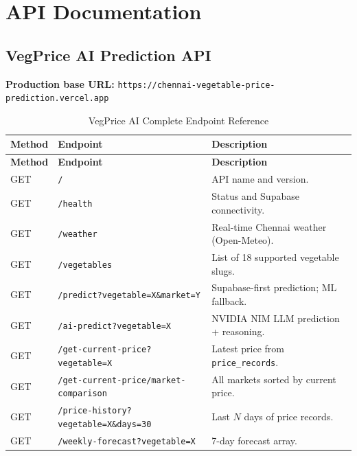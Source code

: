 \documentclass[12pt, a4paper, oneside]{report}
\begin{document}
\chapter{API Documentation}

\section{VegPrice AI Prediction API}

\textbf{Production base URL:}
\texttt{https://chennai-vegetable-price-prediction.vercel.app}

\begin{longtable}{@{} C{1.4cm} L{6.0cm} L{6.8cm} @{}}
\caption{VegPrice AI Complete Endpoint Reference}
\label{tab:pred-endpoints-full} \\
\toprule
\textbf{Method} & \textbf{Endpoint} & \textbf{Description} \\
\midrule
\endfirsthead
\toprule
\textbf{Method} & \textbf{Endpoint} & \textbf{Description} \\
\midrule
\endhead
\bottomrule
\endlastfoot
GET    & \texttt{/}                                   & API name and version. \\[3pt]
GET    & \texttt{/health}                             & Status and Supabase connectivity. \\[3pt]
GET    & \texttt{/weather}                            & Real-time Chennai weather (Open-Meteo). \\[3pt]
GET    & \texttt{/vegetables}                         & List of 18 supported vegetable slugs. \\[3pt]
GET    & \texttt{/predict?vegetable=X\&market=Y}      & Supabase-first prediction; ML fallback. \\[3pt]
GET    & \texttt{/ai-predict?vegetable=X}             & NVIDIA NIM LLM prediction + reasoning. \\[3pt]
GET    & \texttt{/get-current-price?vegetable=X}      & Latest price from \texttt{price\_records}. \\[3pt]
GET    & \texttt{/get-current-price/market-comparison}& All markets sorted by current price. \\[3pt]
GET    & \texttt{/price-history?vegetable=X\&days=30} & Last $N$ days of price records. \\[3pt]
GET    & \texttt{/weekly-forecast?vegetable=X}        & 7-day forecast array. \\[3pt]

\end{longtable}
\end{document}
